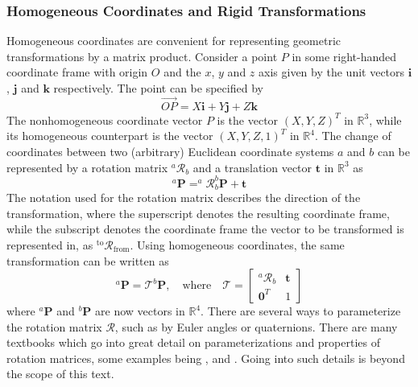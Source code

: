 \subsubsection{Homogeneous Coordinates and Rigid Transformations}
Homogeneous coordinates are convenient for representing geometric transformations by a matrix product.
Consider a point $P$ in some right-handed coordinate frame with origin $O$ and the $x$, $y$ and $z$ axis given by the unit vectors $\mathbf{i}$, $\mathbf{j}$ and $\mathbf{k}$ respectively. The point can be specified by
\begin{equation}
    \overrightarrow{OP}=X\mathbf{i}+Y\mathbf{j}+Z\mathbf{k}
\end{equation}
The nonhomogeneous coordinate vector $P$ is the vector $(X, Y, Z)^T$ in $\mathbb{R}^3$, while its homogeneous counterpart is the vector $(X,Y,Z,1)^T$ in $\mathbb{R}^4$. The change of coordinates between two (arbitrary) Euclidean coordinate systems $a$ and $b$ can be represented by a rotation matrix $^a\mathcal{R}_b$ and a translation vector $\mathbf{t}$ in $\mathbb{R}^3$ as
\begin{equation}
    ^a\mathbf{P}=^a\mathcal{R}_b^b\mathbf{P}+\mathbf{t}
\end{equation}
The notation used for the rotation matrix describes the direction of the transformation, where the superscript denotes the resulting coordinate frame, while the subscript denotes the coordinate frame the vector to be transformed is represented in, as $^{\text{to}}\mathcal{R}_{\text{from}}$.
Using homogeneous coordinates, the same transformation can be written as
\begin{equation}
\label{eq:homo_trans}
    ^a\mathbf{P}=\mathcal{T}^b\mathbf{P},\quad \text{where}\quad \mathcal{T}=\begin{bmatrix}^a\mathcal{R}_b & \mathbf{t} \\
    \mathbf{0}^T & 1 \end{bmatrix}
\end{equation}
where $^a\mathbf{P}$ and $^b\mathbf{P}$ are now vectors in $\mathbb{R}^4$. There are several ways to parameterize the rotation matrix $\mathcal{R}$, such as by Euler angles or quaternions. There are many textbooks which go into great detail on parameterizations and properties of rotation matrices, some examples being \cite{modsim}, \cite{kinematics} and \cite{geometry}. Going into such details is beyond the scope of this text.
